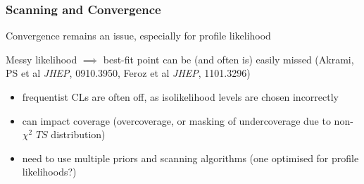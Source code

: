 \documentclass[xcolor=dvipsnames]{beamer}
\newcommand{\cblue}[1]{{\color[rgb]{0.1, 0.0, 0.6} #1}}
\begin{document}
\begin{frame}
\frametitle{Scanning and Convergence}
\cblue{Convergence remains an issue, especially for profile likelihood}\vspace{2mm}

Messy likelihood $\implies$ best-fit point can be (and often is) easily missed {\tiny(Akrami, PS et al {\it JHEP}, 0910.3950, Feroz et al {\it JHEP}, 1101.3296)}
      \begin{itemize}\footnotesize
                 \item frequentist CLs are often off, as isolikelihood levels are chosen incorrectly
                 \item can impact coverage (overcoverage, or masking of undercoverage due to non-$\chi^2$ $TS$ distribution)
                 \item need to use multiple priors and scanning algorithms (one optimised for profile likelihoods?)  
                 \end{itemize}
\end{frame}
\end{document}
